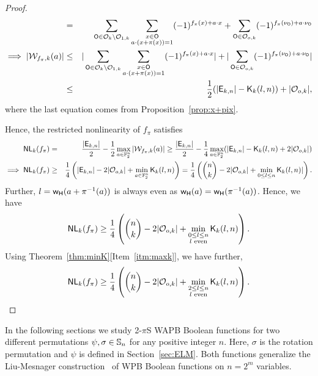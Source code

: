 \documentclass{llncs}
\begin{document}
\begin{proof}
\begin{eqnarray*}
& =  & \sum_{\mathsf{O} \in \mathcal{O}_k\setminus \mathcal{O}_{1,k}} \sum_{\substack{x \in \mathsf{O} \\ a \cdot (x + \pi(x))= 1}} (-1)^{f_\pi(x)+ a \cdot x} + \sum_{\mathsf{O} \in \mathcal{O}_{o,k}} (-1)^{ f_\pi(\nu_{\mathsf{O}}) + a \cdot \nu_{\mathsf{O}}}\nonumber \\
\implies |\mathcal{W}_{f_\pi,k}(a)| & \leq & |\sum_{\mathsf{O} \in \mathcal{O}_k\setminus \mathcal{O}_{1,k}} \sum_{\substack{x \in \mathsf{O} \\ a \cdot (x + \pi(x))= 1}} (-1)^{f_\pi(x)+ a \cdot x}| + |\sum_{\mathsf{O} \in \mathcal{O}_{o,k}} (-1)^{ f_\pi(\nu_{\mathsf{O}}) + a \cdot \nu_{\mathsf{O}}}|\nonumber \\
& \leq & \frac{1}{2} (|\mathsf{E}_{k,n}| - \mathsf{K}_{k}(l,n)) + |\mathcal{O}_{o,k}|,
\end{eqnarray*}
where the last equation comes from Proposition~\ref{prop:x+pix}.

Hence, the restricted nonlinearity of $f_\pi$ satisfies
\begin{eqnarray*}
\mathsf{NL}_{k}(f_\pi) & = & \frac{|\mathsf{E}_{k,n}|}{2} -\frac{1}{2} \max_{a\in \mathbb{F}_2^n}| \mathcal{W}_{f_\pi,k}(a)| \geq \frac{|\mathsf{E}_{k,n}|}{2} - \frac{1}{4}\max_{a\in \mathbb{F}_2^n} (|\mathsf{E}_{k,n}| - \mathsf{K}_{k}(l,n) + 2|\mathcal{O}_{o,k}|) \\
\implies \mathsf{NL}_{k}(f_\pi) & \geq & \frac{1}{4}\left(|\mathsf{E}_{k,n}|  - 2|\mathcal{O}_{o,k}| + \min_{a\in \mathbb{F}_2^n} \mathsf{K}_{k}(l,n)\right)
= \frac{1}{4}\left({n \choose k}  - 2|\mathcal{O}_{o,k}| + \min_{0 \leq l \leq n} \mathsf{K}_{k}(l,n)|\right).
\end{eqnarray*}
Further, $l = \mathsf{w_H}(a+\pi^{-1}(a))$ is always even as $\mathsf{w_H}(a) = \mathsf{w_H}(\pi^{-1}(a))$. Hence, we have
$$\mathsf{NL}_{k}(f_\pi) \geq \frac{1}{4}\left({n \choose k} - 2|\mathcal{O}_{o,k}| + \min_{\substack{0 \leq l \leq n \\ l \text{ even}}} \mathsf{K}_{k}(l,n)\right).$$
Using Theorem~\ref{thm:minK}[Item~\ref{itm:maxk}], we have further,
$$\mathsf{NL}_{k}(f_\pi) \geq \frac{1}{4}\left({n \choose k} - 2|\mathcal{O}_{o,k}| + \min_{\substack{2 \leq l \leq n \\ l \text{ even}}} \mathsf{K}_{k}(l,n)\right).$$
\end{proof}



In the following sections we study 2-$\pi$S WAPB Boolean functions for two different permutations $\psi, \sigma \in \mathbb{S}_n$ for any positive integer $n$.
Here, $\sigma$ is the rotation permutation and $\psi$ is defined in Section~\ref{sec:ELM}. 
Both functions generalize the Liu-Mesnager construction~\cite{DCC:LiuMes19} of WPB Boolean functions on $n = 2^m$ variables.
\end{document}
